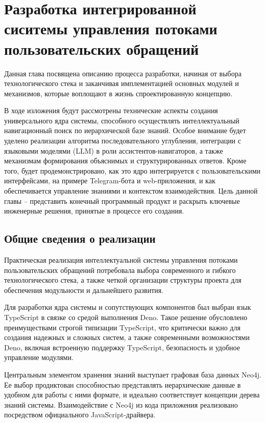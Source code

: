 \section{Разработка интегрированной сиситемы управления потоками пользовательских обращений}
\label{sec:development}

Данная глава посвящена описанию процесса разработки, начиная от выбора технологического стека и заканчивая имплементацией основных модулей и механизмов, которые воплощают в жизнь спроектированную концепцию.

В ходе изложения будут рассмотрены технические аспекты создания универсального ядра системы, способного осуществлять интеллектуальный навигационный поиск по иерархической базе знаний. Особое внимание будет уделено реализации алгоритма последовательного углубления, интеграции с языковыми моделями (LLM) в роли ассистентов-навигаторов, а также механизмам формирования объяснимых и структурированных ответов. Кроме того, будет продемонстрировано, как это ядро интегрируется с пользовательскими интерфейсами, на примере Telegram-бота и web-приложения, и как обеспечивается управление знаниями и контекстом взаимодействия. Цель данной главы -- представить конечный программный продукт и раскрыть ключевые инженерные решения, принятые в процессе его создания.

\subsection{Общие сведения о реализации}

Практическая реализация интеллектуальной системы управления потоками пользовательских обращений потребовала выбора современного и гибкого технологического стека, а также четкой организации структуры проекта для обеспечения модульности и дальнейшего развития.

Для разработки ядра системы и сопутствующих компонентов был выбран язык TypeScript в связке со средой выполнения Deno. Такое решение обусловлено преимуществами строгой типизации TypeScript, что критически важно для создания надежных и сложных систем, а также современными возможностями Deno, включая встроенную поддержку TypeScript, безопасность и удобное управление модулями.

Центральным элементом хранения знаний выступает графовая база данных Neo4j. Ее выбор продиктован способностью представлять иерархические данные в удобном для работы с ними формате, и идеально соответствует концепции дерева знаний системы. Взаимодействие с Neo4j из кода приложения реализовано посредством официального JavaScript-драйвера.

